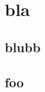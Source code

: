 \documentclass{book}
\begin{document}
\dominitoc%
\tableofcontents

\chapter{bla}
\minitoc%

\section{blubb}

\section{foo}
\end{document}
